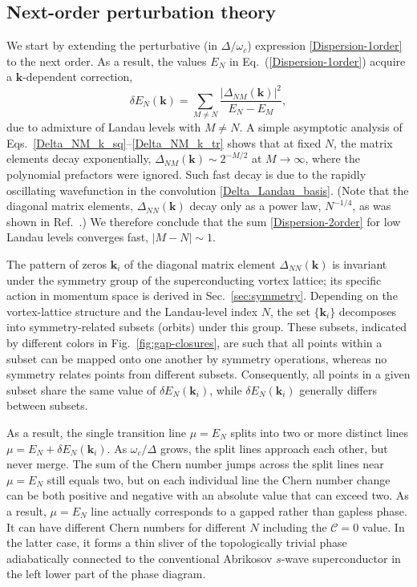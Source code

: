 \documentclass[10pt,prb,aps,superscriptaddress,amsmath,amssymb,twocolumn,floatfix,longbibliography]{revtex4-1}
\newcommand{\be}{\begin{equation} }
\newcommand{\ee}{\end{equation}}
\begin{document}
\subsection{Next-order perturbation theory}
\label{sec:next-order-perturbation}
We start by extending the perturbative (in $\Delta / \omega_c$) expression \eqref{Dispersion-1order} to the next order. As a result, the values $E_N$ in Eq.~(\ref{Dispersion-1order}) acquire a $\bm k$-dependent correction,
\be \label{Dispersion-2order}
    \delta E_N(\bm{k}) = \sum_{M\neq N}\frac{|\Delta_{NM}(\bm{k})|^2}{E_N - E_M},
\ee
due to admixture of Landau levels with $M\neq N$.
A simple asymptotic analysis of Eqs.~\eqref{Delta_NM_k_sq}--\eqref{Delta_NM_k_tr} shows that at fixed $N$, the matrix elements decay exponentially, $\Delta_{NM}(\bm{k}) \sim 2^{-M/2}$ at $M\to\infty$, where the polynomial prefactors were ignored. Such fast decay is due to the rapidly oscillating wavefunction in the convolution \eqref{Delta_Landau_basis}. (Note that the diagonal matrix elements, $\Delta_{NN}(\bm{k})$ decay only as a power law, $N^{-1/4}$, as was shown in Ref.~.) We therefore conclude that the sum \eqref{Dispersion-2order} for low Landau levels converges fast, $|M - N|\sim 1$. 

The pattern of zeros $\mathbf{k}_i$ of the diagonal matrix element $\Delta_{NN}(\mathbf{k})$ is invariant under the symmetry group of the superconducting vortex lattice; its specific action in momentum space is derived in Sec.~\ref{sec:symmetry}. Depending on the vortex-lattice structure and the Landau-level index $N$, the set $\{\mathbf{k}_i\}$ decomposes into symmetry-related subsets (orbits) under this group. These subsets, indicated by different colors in Fig.~\ref{fig:gap-closures}, are such that all points within a subset can be mapped onto one another by symmetry operations, whereas no symmetry relates points from different subsets. Consequently, all points in a given subset share the same value of $\delta E_N(\mathbf{k}_i)$, while $\delta E_N(\mathbf{k}_i)$ generally differs between subsets. 



As a result, the single transition line $\mu = E_N$ splits into two or more distinct lines $\mu = E_N + \delta E_N(\mathbf{k}_i)$.
As $\omega_c / \Delta$ grows, the split lines approach each other, but never merge. The sum of the Chern number jumps across the split lines near $\mu = E_N$ still equals two, but on each individual line the Chern number change can be both positive and negative with an absolute value that can exceed two. As a result, $\mu = E_N$ line actually corresponds to a gapped rather than gapless phase. It can have different Chern numbers for different $N$  including the $\mathcal{C} = 0$ value. In the latter case, it forms a thin sliver of the topologically trivial phase adiabatically connected to the conventional Abrikosov $s$-wave superconductor in the left lower part of the phase diagram.  
\end{document}

